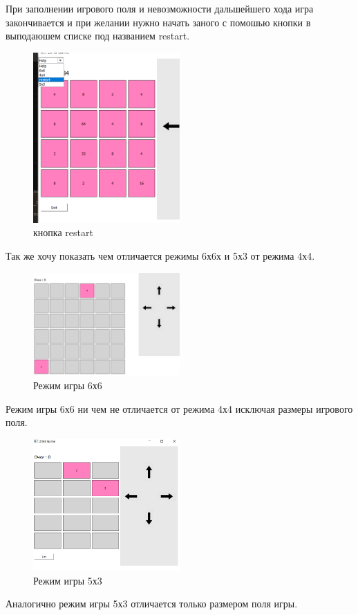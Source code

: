 При заполнении игрового поля и невозможности дальшейшего хода игра закончивается и при желании нужно начать заного с помошью кнопки в выподаюшем списке под названием restart.
\begin{figure}[ht]
    \centering
    \includegraphics[width=0.5\textwidth]{images/4.png}
    \caption{кнопка restart}
    \label{fig:enter-label}
\end{figure}

Так же хочу показать чем отличается режимы 6х6х и 5х3 от режима 4х4.

\begin{figure}[ht]
    \centering
    \includegraphics[width=0.5\textwidth]{images/5.png}
    \caption{Режим игры 6х6}
    \label{fig:enter-label}
\end{figure}
Режим игры 6х6 ни чем не отличается от режима 4х4 исключая размеры игрового поля.
\begin{figure}[ht]
    \centering
    \includegraphics[width=0.5\textwidth]{images/6.png}
    \caption{Режим игры 5х3}
    \label{fig:enter-label}
\end{figure}
Аналогично режим игры 5х3 отличается только размером поля игры.




